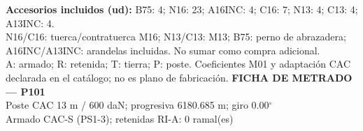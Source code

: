 \begingroup\scriptsize
\textbf{Accesorios incluidos (ud):} B75: 4; N16: 23; A16INC: 4; C16: 7; N13: 4; C13: 4; A13INC: 4.\\
N16/C16: tuerca/contratuerca M16; N13/C13: M13; B75: perno de abrazadera; A16INC/A13INC: arandelas incluidas. No sumar como compra adicional.\\
A: armado; R: retenida; T: tierra; P: poste. Coeficientes M01 y adaptación CAC declarada en el catálogo; no es plano de fabricación.
\endgroup\endgroup
\clearpage{}
\begingroup\small\setlength{\parskip}{3pt}\renewcommand{\arraystretch}{1.05}
\textbf{\large FICHA DE METRADO — P101}\\[4pt]
Poste CAC 13 m / 600 daN; progresiva 6180.685 m; giro 0.00\ensuremath{^\circ}\\
Armado CAC-S (PS1-3); retenidas RI-A: 0 ramal(es)\\
\begingroup\scriptsize
